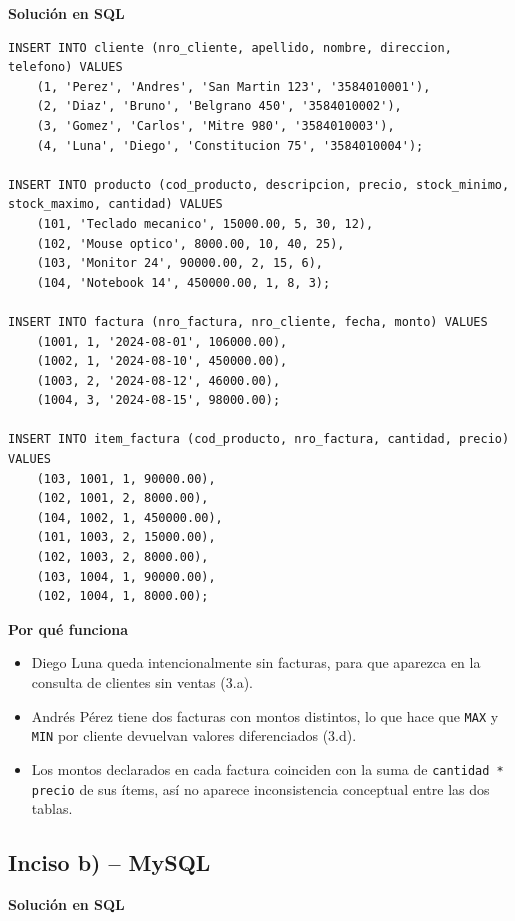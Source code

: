\documentclass[11pt,a4paper]{article}
\newcommand{\itemcabecera}[1]{\noindent\textbf{#1}\par\medskip}
\newcommand{\bloqueSolucion}{\itemcabecera{Soluci\'on en SQL}}
\newcommand{\bloquePorque}{\itemcabecera{Por qu\'e funciona}}
\begin{document}
\bloqueSolucion

\begin{lstlisting}
INSERT INTO cliente (nro_cliente, apellido, nombre, direccion, telefono) VALUES
    (1, 'Perez', 'Andres', 'San Martin 123', '3584010001'),
    (2, 'Diaz', 'Bruno', 'Belgrano 450', '3584010002'),
    (3, 'Gomez', 'Carlos', 'Mitre 980', '3584010003'),
    (4, 'Luna', 'Diego', 'Constitucion 75', '3584010004');

INSERT INTO producto (cod_producto, descripcion, precio, stock_minimo, stock_maximo, cantidad) VALUES
    (101, 'Teclado mecanico', 15000.00, 5, 30, 12),
    (102, 'Mouse optico', 8000.00, 10, 40, 25),
    (103, 'Monitor 24', 90000.00, 2, 15, 6),
    (104, 'Notebook 14', 450000.00, 1, 8, 3);

INSERT INTO factura (nro_factura, nro_cliente, fecha, monto) VALUES
    (1001, 1, '2024-08-01', 106000.00),
    (1002, 1, '2024-08-10', 450000.00),
    (1003, 2, '2024-08-12', 46000.00),
    (1004, 3, '2024-08-15', 98000.00);

INSERT INTO item_factura (cod_producto, nro_factura, cantidad, precio) VALUES
    (103, 1001, 1, 90000.00),
    (102, 1001, 2, 8000.00),
    (104, 1002, 1, 450000.00),
    (101, 1003, 2, 15000.00),
    (102, 1003, 2, 8000.00),
    (103, 1004, 1, 90000.00),
    (102, 1004, 1, 8000.00);
\end{lstlisting}

\bloquePorque

\begin{itemize}
    \item Diego Luna queda intencionalmente sin facturas, para que aparezca en la consulta de clientes sin ventas (3.a).
    \item Andrés Pérez tiene dos facturas con montos distintos, lo que hace que \texttt{MAX} y \texttt{MIN} por cliente devuelvan valores diferenciados (3.d).
    \item Los montos declarados en cada factura coinciden con la suma de \texttt{cantidad * precio} de sus ítems, así no aparece inconsistencia conceptual entre las dos tablas.
\end{itemize}

\subsection{Inciso b) -- MySQL}

\bloqueSolucion
\end{document}
